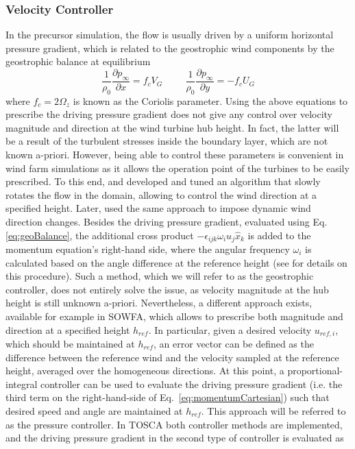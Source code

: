 \documentclass[journal abbreviation, manuscript]{copernicus}
\begin{document}
\subsubsection{Velocity Controller}
\label{subsubsec:velocityController}
In the precursor simulation, the flow is usually driven by a uniform horizontal pressure gradient, which is related to the geostrophic wind components by the geostrophic balance at equilibrium
\begin{equation}
    \frac{1}{\rho_0}\frac{\partial p_\infty}{\partial x} = f_cV_G \hspace{1cm}
	\frac{1}{\rho_0}\frac{\partial p_\infty}{\partial y} = -f_cU_G \label{eq:geoBalance}
\end{equation}
where $f_c = 2\Omega_z$ is known as the Coriolis parameter. Using the above equations to prescribe the driving pressure gradient does not give any control over velocity magnitude and direction at the wind turbine hub height. In fact, the latter will be a result of the turbulent stresses inside the boundary layer, which are not known a-priori. However, being able to control these parameters is convenient in wind farm simulations as it allows the operation point of the turbines to be easily prescribed. To this end, \cite{2014_SescuMeneveau} and \cite{2015_AllaertsMeyers} developed and tuned an algorithm that slowly rotates the flow in the domain, allowing to control the wind direction at a specified height. Later, \cite{2021_StierenEtAl} used the same approach to impose dynamic wind direction changes. Besides the driving pressure gradient, evaluated using Eq. \ref{eq:geoBalance}, the additional cross product $-\epsilon_{ijk}\omega_iu_j\widehat{x}_k$ is added to the momentum equation's right-hand side, where the angular frequency $\omega_i$ is calculated based on the angle difference at the reference height (see \citealp{2015_AllaertsMeyers} for details on this procedure). Such a method, which we will refer to as the geostrophic controller, does not entirely solve the issue, as velocity magnitude at the hub height is still unknown a-priori. Nevertheless, a different approach exists, available for example in SOWFA, which allows to prescribe both magnitude and direction at a specified height $h_{ref}$. In particular, given a desired velocity $u_{ref,i}$, which should be maintained at $h_{ref}$, an error vector can be defined as the difference between the reference wind and the velocity sampled at the reference height, averaged over the homogeneous directions. At this point, a proportional-integral controller can be used to evaluate the driving pressure gradient (i.e. the third term on the right-hand-side of Eq.~\ref{eq:momentumCartesian}) such that desired speed and angle are maintained at $h_{ref}$. This approach will be referred to as the pressure controller. In TOSCA both controller methods are implemented, and the driving pressure gradient in the second type of controller is evaluated as
\end{document}
